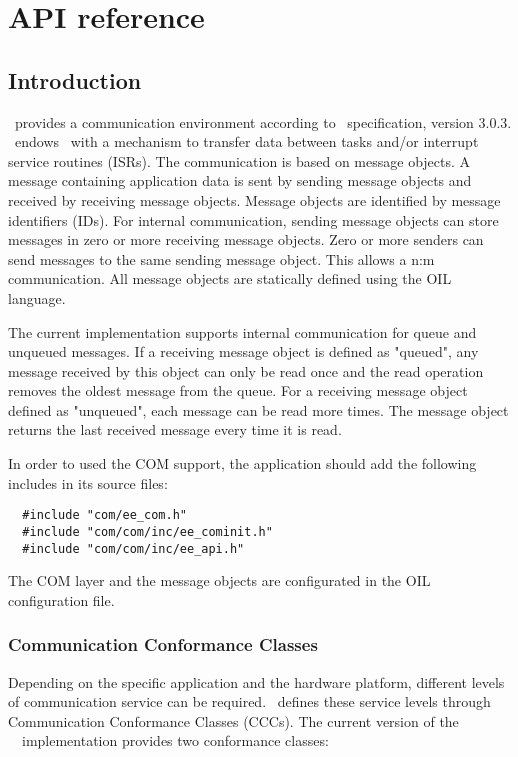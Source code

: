 \chapter{API reference}
\label{sec:api_reference}

\section{Introduction}
\ee\ provides a communication environment according to \oc\ specification, 
version 3.0.3. \oc\ endows \ee\ with a mechanism to transfer data between tasks 
and/or interrupt service routines (ISRs). The communication is based on message 
objects. A message containing application data is sent by sending message objects 
and received by receiving message objects.  Message objects are identified by 
message identifiers (IDs). For internal communication, sending message objects 
can store messages in zero or more receiving message objects. Zero or more senders 
can send messages to the same sending message object. This allows a n:m communication. 
All message objects are statically defined using the OIL language.    

The current implementation supports internal communication for queue and 
unqueued messages. If a receiving message object is defined as "queued", 
any message received by this object can only be read once and the read 
operation removes the oldest message from the queue. For a receiving message 
object defined as "unqueued", each message can be read more times. The message 
object returns the last received message every time it is read.

In order to used the COM support, the application should add the following includes
in its source files:
\begin {lstlisting}
  #include "com/ee_com.h"
  #include "com/com/inc/ee_cominit.h"
  #include "com/com/inc/ee_api.h"
\end{lstlisting}

The COM layer and the message objects are configurated in the OIL configuration 
file.


\subsection{Communication Conformance Classes}
Depending on the specific application and the hardware platform, different 
levels of communication service can be required. \oc\ defines these service 
levels through  Communication Conformance Classes (CCCs). The current version of 
the \ee\ \oc\ implementation provides two conformance classes:

